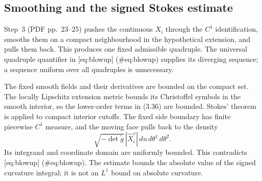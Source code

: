 \documentclass[10pt]{article}
\begin{document}
\subsection*{Smoothing and the signed Stokes estimate}
Step 3 (PDF pp. 23–25) pushes the continuous \(X_i\) through the \(C^1\) identification, smooths them on a compact neighbourhood in the hypothetical extension, and pulls them back. This produces one fixed admissible quadruple. The universal quadruple quantifier in [eq:blowup] (\#eq:blowup) supplies its diverging sequence; a sequence uniform over all quadruples is unnecessary.\par
The fixed smooth fields and their derivatives are bounded on the compact set. The locally Lipschitz extension metric bounds its Christoffel symbols in the smooth interior, so the lower-order terms in (3.36) are bounded. Stokes’ theorem is applied to compact interior cutoffs. The fixed side boundary has finite piecewise \(C^1\) measure, and the moving face pulls back to the density \[\sqrt{-\det\widetilde g}\,|\widehat X_i^v|\,du\,d\theta^1\,d\theta^2.\] Its integrand and coordinate domain are uniformly bounded. This contradicts [eq:blowup] (\#eq:blowup). The estimate bounds the absolute value of the signed curvature integral; it is not an \(L^1\) bound on absolute curvature.\par
\end{document}
